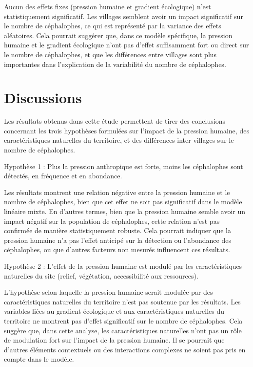 \documentclass[
]{book}
\begin{document}
Aucun des effets fixes (pression humaine et gradient écologique) n'est statistiquement significatif. Les villages semblent avoir un impact significatif sur le nombre de céphalophes, ce qui est représenté par la variance des effets aléatoires. Cela pourrait suggérer que, dans ce modèle spécifique, la pression humaine et le gradient écologique n'ont pas d'effet suffisamment fort ou direct sur le nombre de céphalophes, et que les différences entre villages sont plus importantes dans l'explication de la variabilité du nombre de céphalophes.

\chapter{Discussions}\label{discussions}

Les résultats obtenus dans cette étude permettent de tirer des conclusions concernant les trois hypothèses formulées sur l'impact de la pression humaine, des caractéristiques naturelles du territoire, et des différences inter-villages sur le nombre de céphalophes.

Hypothèse 1 : Plus la pression anthropique est forte, moins les céphalophes sont détectés, en fréquence et en abondance.

Les résultats montrent une relation négative entre la pression humaine et le nombre de céphalophes, bien que cet effet ne soit pas significatif dans le modèle linéaire mixte. En d'autres termes, bien que la pression humaine semble avoir un impact négatif sur la population de céphalophes, cette relation n'est pas confirmée de manière statistiquement robuste. Cela pourrait indiquer que la pression humaine n'a pas l'effet anticipé sur la détection ou l'abondance des céphalophes, ou que d'autres facteurs non mesurés influencent ces résultats.

Hypothèse 2 : L'effet de la pression humaine est modulé par les caractéristiques naturelles du site (relief, végétation, accessibilité aux ressources).

L'hypothèse selon laquelle la pression humaine serait modulée par des caractéristiques naturelles du territoire n'est pas soutenue par les résultats. Les variables liées au gradient écologique et aux caractéristiques naturelles du territoire ne montrent pas d'effet significatif sur le nombre de céphalophes. Cela suggère que, dans cette analyse, les caractéristiques naturelles n'ont pas un rôle de modulation fort sur l'impact de la pression humaine. Il se pourrait que d'autres éléments contextuels ou des interactions complexes ne soient pas pris en compte dans le modèle.
\end{document}
